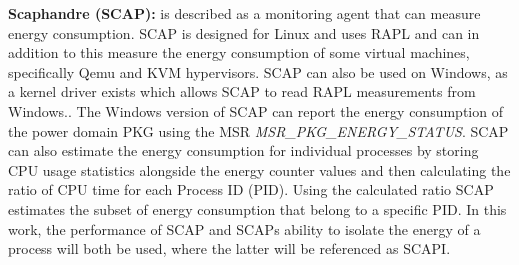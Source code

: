 
\noindent\textbf{Scaphandre (SCAP):} is described as a monitoring agent that can measure energy consumption.\cite{scaphandre} SCAP is designed for Linux and uses RAPL and can in addition to this measure the energy consumption of some virtual machines, specifically Qemu and KVM hypervisors. SCAP can also be used on Windows, as a kernel driver exists which allows SCAP to read RAPL measurements from Windows.\cite{RAPL_Windows}. %
The Windows version of SCAP can report the energy consumption of the power domain PKG using the MSR \textit{MSR\_PKG\_ENERGY\_STATUS}. SCAP can also estimate the energy consumption for individual processes by storing CPU usage statistics alongside the energy counter values and then calculating the ratio of CPU time for each Process ID (PID). Using the calculated ratio SCAP estimates the subset of energy consumption that belong to a specific PID. In this work, the performance of SCAP and SCAPs ability to isolate the energy of a process will both be used, where the latter will be referenced as SCAPI.

